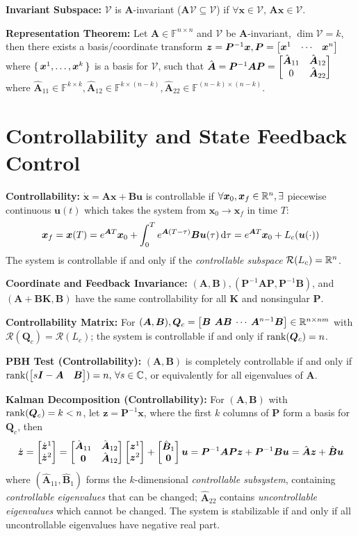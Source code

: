 \documentclass[twocolumn, 8pt]{extarticle}
\begin{document}
\textbf{Invariant Subspace:} \(\mathcal V\) is \(\bm A\)-invariant (\(\bm A\mathcal V \subseteq \mathcal V\)) if
\(\forall\bm x \in \mathcal V,\,\bm A\bm x \in \mathcal V\).

\textbf{Representation Theorem:} Let \(\bm A \in \mathbb F^{n\times n}\) and \(\mathcal V\) be \(\bm A\)-invariant, \(\dim\mathcal
V = k\), then there exists a basis/coordinate transform \(\bm z = \bm P^{-1}\bm x, \bm P = \rvec{\bm x^1}{\cdots}{\bm
x^n}\) where \(\set{\bm x^1, \dots, \bm x^k}\) is a basis for \(\mathcal V\), such that
\(\hat{\bm A} = \bm P^{-1}\bm A\bm P = \begin{bmatrix} {\hat{\bm A}_{11}} & {\hat{\bm A}_{12}} \\ {0} & {\hat{\bm A}_{22}} \end{bmatrix}\)
where \(\hat{\bm A}_{11} \in \mathbb F^{k \times k}, \hat{\bm A}_{12} \in \mathbb F^{k \times (n - k)}, \hat{\bm A}_{22}
\in \mathbb F^{(n - k) \times (n - k)}\).

\section{Controllability and State Feedback Control}

\textbf{Controllability:} \(\dot{\bm x} = \bm A\bm x + \bm B\bm u\) is controllable if
\(\forall \bm x_0, \bm x_f \in \mathbb{R}^n, \exists\) piecewise continuous \(\bm u(t)\) which takes the system from
\(\bm x_0 \to \bm x_f\) in time \(T\):
\[\bm x_f = \bm x(T) = e^{\bm AT}\bm x_0 + \int _0^T e^{\bm A(T - \tau)}\bm B\bm u(\tau)\,\mathrm{d}\tau = e^{\bm AT}\bm x_0 + L_c(\bm u(\cdot))\]
The system is controllable if and only if the \textit{controllable subspace} \(\mathcal R(L_c) = \mathbb{R}^n\).

\textbf{Coordinate and Feedback Invariance:} \((\bm A, \bm B), (\bm P^{-1}\bm A\bm P, \bm P^{-1}\bm B)\), and
\((\bm A + \bm B\bm K, \bm B)\) have the same controllability for all \(\bm K\) and nonsingular \(\bm P\).

\textbf{Controllability Matrix:} For \((\bm A, \bm B), \bm Q_c = \setlength{\arraycolsep}{2pt}\rvec{\bm B}{\bm A\bm B}{\cdots}{\bm A^{n - 1}\bm B} \in \reals^{n \times nm}\)
with \(\mathcal R(\bm Q_c) = \mathcal R(L_c)\); the system is controllable if and only if \(\operatorname{rank}(\bm Q_c) = n\).

\textbf{PBH Test (Controllability):} \((\bm A, \bm B)\) is completely controllable if and only if
\(\rank(\rvec{s\bm I - \bm A}{\bm B}) = n,\,\forall s \in \complex\), or equivalently for all eigenvalues of \(\bm A\).

\textbf{Kalman Decomposition (Controllability):} For \((\bm A, \bm B)\) with \(\operatorname{rank}(\bm Q_c) = k < n\), let
\(\bm z = \bm P^{-1}\bm x\), where the first \(k\) columns of \(\bm P\) form a basis for \(\bm Q_c\), then
\[\dot{\bm z} = \cvec{\dot{\bm z}^1}{\dot{\bm z}^2} = \mattwo{\hat{\bm A}_{11}}{\hat{\bm A}_{12}}{\bm 0}{\hat{\bm A}_{12}}\cvec{\bm z^1}{\bm z^2} + \cvec{\hat{\bm B}_1}{\bm 0}\bm u
= \bm P^{-1}\bm A\bm P\bm z + \bm P^{-1}\bm B\bm u = \hat{\bm A}\bm z + \hat{\bm B}\bm u\]
where \((\hat{\bm A}_{11}, \hat{\bm B}_1)\) forms the \(k\)-dimensional \textit{controllable subsystem}, containing
\textit{controllable eigenvalues} that can be changed; \(\hat{\bm A}_{22}\) contains \textit{uncontrollable eigenvalues}
which cannot be changed. The system is stabilizable if and only if all uncontrollable eigenvalues have negative real part.
\end{document}
